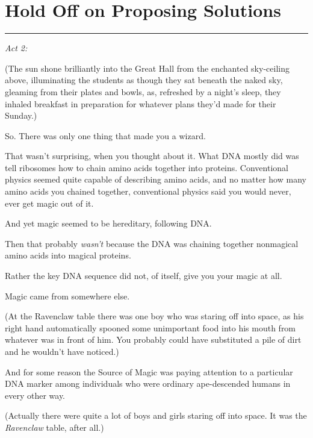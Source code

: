 \chapter{Hold Off on Proposing Solutions}

\begin{center}\rule{3in}{0.4pt}\end{center}

\emph{Act 2:}

(The sun shone brilliantly into the Great Hall from the enchanted
sky-ceiling above, illuminating the students as though they sat beneath
the naked sky, gleaming from their plates and bowls, as, refreshed by a
night's sleep, they inhaled breakfast in preparation for whatever plans
they'd made for their Sunday.)

So. There was only one thing that made you a wizard.

That wasn't surprising, when you thought about it. What DNA mostly did
was tell ribosomes how to chain amino acids together into proteins.
Conventional physics seemed quite capable of describing amino acids, and
no matter how many amino acids you chained together, conventional
physics said you would never, ever get magic out of it.

And yet magic seemed to be hereditary, following DNA.

Then that probably \emph{wasn't} because the DNA was chaining together
nonmagical amino acids into magical proteins.

Rather the key DNA sequence did not, of itself, give you your magic at
all.

Magic came from somewhere else.

(At the Ravenclaw table there was one boy who was staring off into
space, as his right hand automatically spooned some unimportant food
into his mouth from whatever was in front of him. You probably could
have substituted a pile of dirt and he wouldn't have noticed.)

And for some reason the Source of Magic was paying attention to a
particular DNA marker among individuals who were ordinary ape-descended
humans in every other way.

(Actually there were quite a lot of boys and girls staring off into
space. It was the \emph{Ravenclaw} table, after all.)

